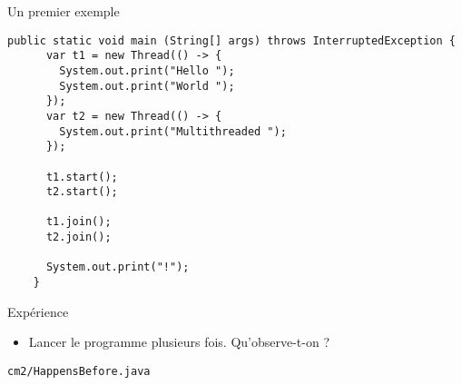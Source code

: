 
\begingroup

\begin{frame}[fragile]{Un premier exemple}

  \begin{lstlisting}[gobble=4]
    public static void main (String[] args) throws InterruptedException {
      var t1 = new Thread(() -> {
        System.out.print("Hello ");
        System.out.print("World ");
      });
      var t2 = new Thread(() -> {
        System.out.print("Multithreaded ");
      });
      
      t1.start();
      t2.start();

      t1.join();
      t2.join();

      System.out.print("!");
    }
  \end{lstlisting}

  \begin{block}{Expérience}
    \begin{itemize}
    \item Lancer le programme plusieurs fois. Qu'observe-t-on ? 
    \end{itemize}
  \end{block}

  \begin{citing}
    \jitem \lstinline{cm2/HappensBefore.java}
  \end{citing}

\end{frame}

\endgroup
\endinput
